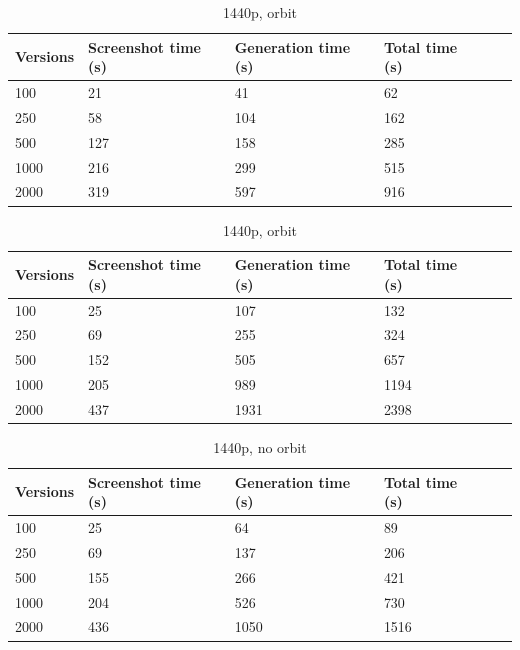 \documentclass[]{usiinfbachelorproject}
\begin{document}
\begin{table}[H]
    \begin{center}
        \begin{tabular}{ | l | l | l | l | l | l |}
        \hline
        Versions & Screenshot time (s) & Generation time (s)& Total time (s) \\ \hline
        100 & 21 & 41 & 62 \\ \hline
        250 & 58 & 104 & 162\\ \hline
        500 & 127 & 158 & 285\\ \hline
        1000 & 216 & 299 & 515\\ \hline
        2000 & 319 & 597 & 916\\ \hline
        \end{tabular}
    \end{center}
    \caption{1080p, no orbit}
    \label{tab:performance6}

    \begin{center}
        \begin{tabular}{ | l | l | l | l | l | l |}
        \hline
        Versions & Screenshot time (s) & Generation time (s)& Total time (s) \\ \hline
        100 & 25 & 107 & 132 \\ \hline
        250 & 69 & 255 & 324\\ \hline
        500 & 152 & 505 & 657\\ \hline
        1000 & 205 & 989 & 1194\\ \hline
        2000 & 437 & 1931 & 2398\\ \hline
        \end{tabular}
    \end{center}
    \caption{1440p, orbit}
    \label{tab:performance7}
    \end{table}

\begin{table}[H]
    \begin{center}
        \begin{tabular}{ | l | l | l | l | l | l |}
        \hline
        Versions & Screenshot time (s) & Generation time (s)& Total time (s) \\ \hline
        100 & 25 & 64 & 89 \\ \hline
        250 & 69 & 137 & 206\\ \hline
        500 & 155 & 266 & 421\\ \hline
        1000 & 204 & 526 & 730\\ \hline
        2000 & 436 & 1050 & 1516\\ \hline
        \end{tabular}
    \end{center}
    \caption{1440p, no orbit}
    \label{tab:performance8}
\end{table}
\end{document}
